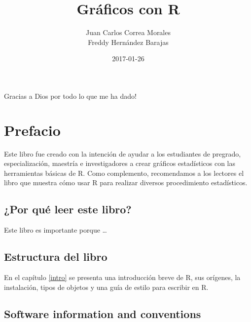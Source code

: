 \documentclass[10pt,]{krantz}
\title{Gráficos con R}
\author{Juan Carlos Correa Morales\\
Freddy Hernández Barajas}
\date{2017-01-26}
\let\proglang=\textsf
\begin{document}
\maketitle


\thispagestyle{empty}

\begin{center}


Gracias a Dios por todo lo que me ha dado!

\end{center}

\setlength{\abovedisplayskip}{-5pt}
\setlength{\abovedisplayshortskip}{-5pt}

{
\hypersetup{linkcolor=black}
\setcounter{tocdepth}{2}
\tableofcontents
}
\listoftables
\listoffigures
\chapter*{Prefacio}\label{prefacio}


Este libro fue creado con la intención de ayudar a los estudiantes de
pregrado, especialización, maestría e investigadores a crear gráficos
estadísticos con las herramientas básicas de \proglang{R}. Como
complemento, recomendamos a los lectores el libro
\citet{hernandez_usuga} que muestra cómo usar \proglang{R} para realizar
diversos procedimiento estadísticos.

\section*{¿Por qué leer este libro?}\label{por-que-leer-este-libro}


Este libro es importante porque \ldots{}

\section*{Estructura del libro}\label{estructura-del-libro}


En el capítulo \ref{intro} se presenta una introducción breve de
\proglang{R}, sus orígenes, la instalación, tipos de objetos y una guía
de estilo para escribir en \proglang{R}.

\section*{Software information and
conventions}\label{software-information-and-conventions}
\end{document}
